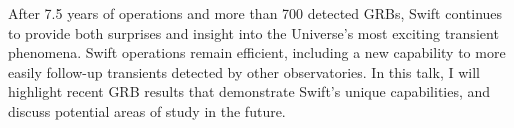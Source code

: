 


\bigskip



\bigskip

\noindent After 7.5 years of operations and more than 700 detected GRBs, Swift continues to provide both surprises and insight into the Universe’s most exciting transient phenomena.  Swift operations remain efficient, including a new capability to more easily follow-up transients detected by other observatories.  In this talk, I will highlight recent GRB results that demonstrate Swift’s unique capabilities, and discuss potential areas of study in the future.
